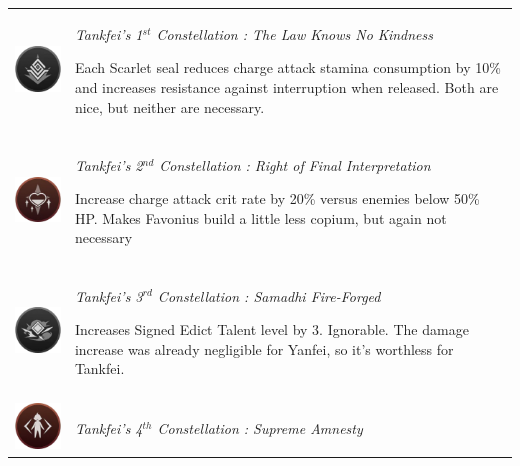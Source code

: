 \documentclass[11pt]{article}
\begin{document}
\begin{tabular}{m{} m{} }
\includegraphics[scale = 0.27]{Constellation1_Greyscale.png}  & \textit{Tankfei's 1$^{st}$ Constellation : The Law Knows No Kindness} 

Each Scarlet seal reduces charge attack stamina consumption by 10\% and increases resistance against interruption when released. Both are nice, but neither are necessary. \\
\\
\includegraphics[scale = 0.27]{Constellation2.png} & \textit{Tankfei's 2$^{nd}$ Constellation : Right of Final Interpretation} 
    
Increase charge attack crit rate by 20\% versus enemies below 50\% HP. Makes Favonius build a little less copium, but again not necessary \\
\\
\includegraphics[scale = 0.27]{Constellation3_Greyscale.png} & \textit{Tankfei's 3$^{rd}$ Constellation : Samadhi Fire-Forged} 
    
Increases Signed Edict Talent level by 3. Ignorable. The damage increase was already negligible for Yanfei, so it's worthless for Tankfei. \\
\\
\includegraphics[scale = 0.27]{Constellation4.png} & \textit{Tankfei's 4$^{th}$ Constellation : Supreme Amnesty} 
    

\end{tabular}
\end{document}
